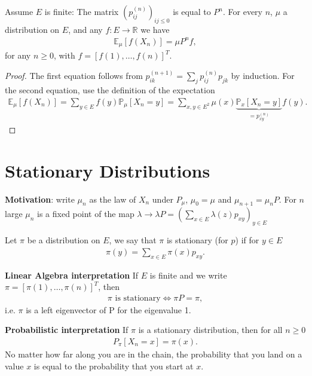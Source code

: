 \begin{prop}[]
	Assume $E$ is finite:
The matrix $(p_{ij}^{(n)})_{ij \leq 0}$ is equal to $P^n$. For every $n$, $\mu$ a distribution on $E$, and any $f:E \to \mathbb{R}$ we have
	\begin{align}
	\mathbb{E}_{\mu} \left[ f(X_n) \right] = \mu P^n f
,\end{align}
for any $n\geq 0$, with $f = [f(1), \ldots ,f(n)]^T$.
\end{prop}
\begin{proof}
	The first equation follows from $p_{ik}^{(n+1)}= \sum_{j}^{} p_{ij}^{(n)}p_{jk}$ by induction. For the second equation, use the definition of the expectation
\begin{align}
	\mathbb{E}_{\mu } \left[ f(X_n) \right]  = \sum_{y \in E}^{}  f(y) \mathbb{P}_{\mu } \left[ X_n = y \right] = \sum_{x,y \in E^2}^{}  \mu (x) \underbrace{\mathbb{P}_{x} \left[ X_n =y \right]}_{=p_{xy}^{(n)}} f(y).
\end{align}
\end{proof}


\section{Stationary Distributions}
\textbf{Motivation}: write $\mu_{n}$ as the law of $X_{n}$ under $P_{\mu}$, $\mu_0=\mu$ and $\mu_{n+1}=\mu_{n}P$. For $n$ large $\mu_n$ is a fixed point of the map $\lambda \to \lambda P = \left( \sum_{x \in E} \lambda(z)p_{xy} \right)_{y \in E}$

\begin{defn}
	Let $\pi$ be a distribution on $E$, we say that $\pi$ is stationary (for $p$) if for $y \in E$
\begin{align}
	\boxed{ \pi(y) = \sum_{x \in E} \pi(x)p_{xy}.}
\end{align}

\textbf{Linear Algebra interpretation} If $E$ is finite and we write  $\pi = [\pi(1), \ldots ,\pi(n)]^T$, then 
\begin{align}
	\boxed{ \pi \textrm{ is stationary} \iff \pi P = \pi ,}
\end{align}
i.e. $\pi$ is a left eigenvector of P for the eigenvalue 1.

\textbf{Probabilistic interpretation} If $\pi $ is a stationary distribution, then for all $ n \geq 0$ 
\begin{align}
	P_{\pi }[X_n =x] = \pi (x)
.\end{align}
No matter how far along you are in the chain, the probability that you land on a value $x$ is equal to the probability that you start at $x$.
\end{defn}

